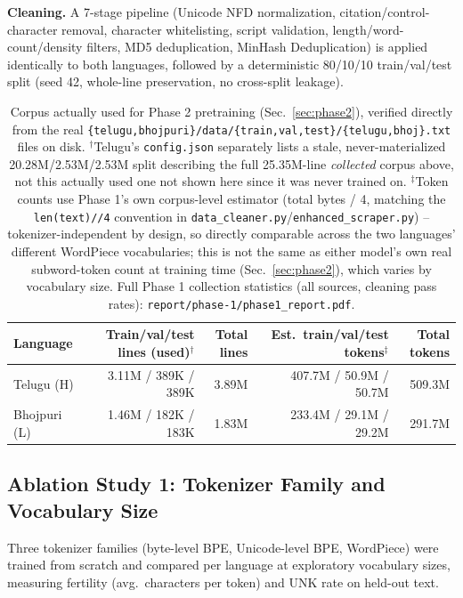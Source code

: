 \documentclass[10pt,a4paper]{article}
\begin{document}
\textbf{Cleaning.} A 7-stage pipeline (Unicode NFD normalization, citation/control-character
removal, character whitelisting, script validation, length/word-count/density filters, MD5
deduplication, MinHash Deduplication) is applied identically to both languages, followed by a deterministic 80/10/10
train/val/test split (seed 42, whole-line preservation, no cross-split leakage).

\begin{table}[H]\centering\footnotesize
\begin{tabular}{lrrrr}
\toprule
Language & Train/val/test lines (used)$^\dagger$ & Total lines & Est.\ train/val/test tokens$^\ddagger$ & Total tokens \\
\midrule
Telugu (H)   & 3.11M / 389K / 389K & 3.89M & 407.7M / 50.9M / 50.7M & 509.3M \\
Bhojpuri (L) & 1.46M / 182K / 183K & 1.83M & 233.4M / 29.1M / 29.2M & 291.7M \\
\bottomrule
\end{tabular}
\caption{Corpus actually used for Phase 2 pretraining (Sec.~\ref{sec:phase2}), verified
directly from the real \texttt{\{telugu,bhojpuri\}/data/\{train,val,test\}/\{telugu,bhoj\}.txt}
files on disk. $^\dagger$Telugu's \texttt{config.json} separately lists a stale,
never-materialized 20.28M/2.53M/2.53M split describing the full 25.35M-line \emph{collected}
corpus above, not this actually used one not shown here since it was never trained on.
$^\ddagger$Token counts use Phase 1's own corpus-level estimator (total bytes / 4, matching the
\texttt{len(text)//4} convention in \texttt{data\_cleaner.py}/\texttt{enhanced\_scraper.py}) --
tokenizer-independent by design, so directly comparable across the two languages' different
WordPiece vocabularies; this is not the same as either model's own real subword-token count at
training time (Sec.~\ref{sec:phase2}), which varies by vocabulary size. Full
Phase 1 collection statistics (all sources, cleaning pass rates): \texttt{report/phase-1/phase1\_report.pdf}.}
\end{table}
\vspace{-8pt}

\subsection*{Ablation Study 1: Tokenizer Family and Vocabulary Size}
Three tokenizer families (byte-level BPE, Unicode-level BPE, WordPiece) were trained from scratch
and compared per language at exploratory vocabulary sizes, measuring fertility (avg.\ characters
per token) and UNK rate on held-out text.
\end{document}
